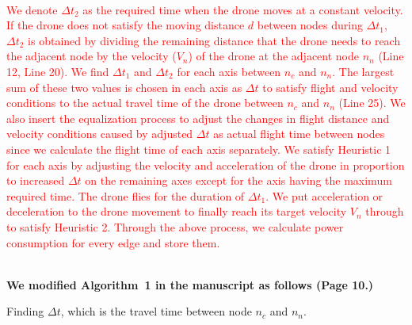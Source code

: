\documentclass[onecolumn]{IEEEconf}
\begin{document}
\begin{description}
\begin{mdframed} [ linewidth=.75pt, userdefinedwidth=0.9\textwidth]
{    %
    }~\\
    \textcolor{red}{
    We denote $\Delta t_2$ as the required time when the drone moves at a constant velocity. 
    If the drone does not satisfy the moving distance $d$ between nodes during $\Delta t_1$, $\Delta t_2$ is obtained by dividing the remaining distance that the drone needs to reach the adjacent node by the velocity ($V_n$) of the drone at the adjacent node $n_n$ (Line 12, Line 20).
    We find $\Delta t_1$ and $\Delta t_2$ for each axis between $n_c$ and $n_n$. The largest sum of these two values is chosen in each axis as $\Delta t$  to satisfy flight and velocity conditions to the actual travel time of the drone between $n_c$ and $n_n$ (Line 25).
    We also insert the equalization process to adjust the changes in flight distance and velocity conditions caused by adjusted $\Delta t$ as actual flight time between nodes since we calculate the flight time of each axis separately.
    We satisfy Heuristic 1 for each axis by adjusting the velocity and acceleration of the drone in proportion to increased $\Delta t$ on the remaining axes except for the axis having the maximum required time.
    The drone flies for the duration of $\Delta t_1$. We put acceleration or deceleration to the drone movement to finally reach its target velocity $V_n$ through to satisfy Heuristic 2.
    Through the above process, we calculate power consumption for every edge and store them.
    }
    \end{mdframed}   
	~\\
	\textbf{We modified Algorithm~1 in the manuscript as follows (Page 10.)}~\\
\SetNlSty{}{\color{red}}{:}
\SetAlFnt{\color{red}}
\setcounter{algocf}{0}
\begin{algorithm}[htp]
\caption{Finding $\Delta t$, which is the travel time between node $n_c$ and $n_n$.}
\SetAlgoLined
{}
\end{algorithm}
\end{description}
\end{document}
